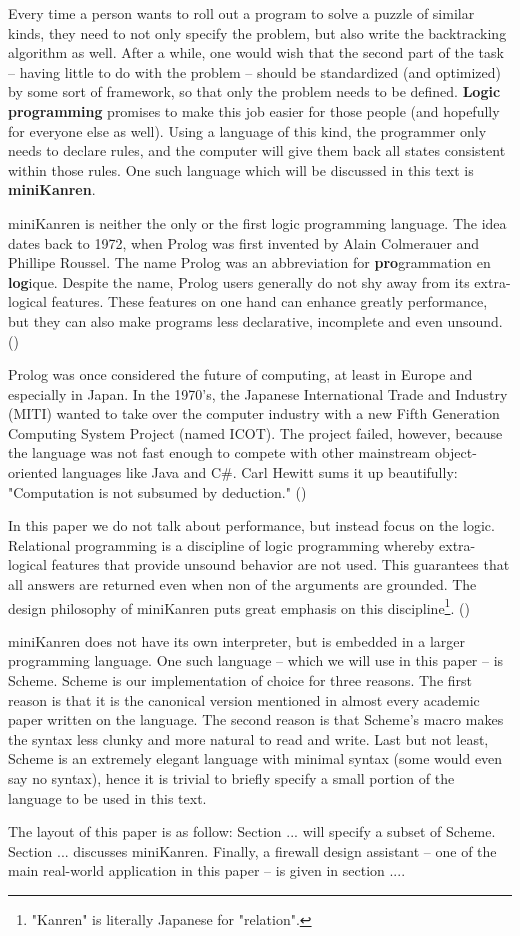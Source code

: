 Every time a person wants to roll out a program to solve a puzzle of similar kinds, they need to not only specify the problem, but also write the backtracking algorithm as well. After a while, one would wish that the second part of the task -- having little to do with the problem -- should be standardized (and optimized) by some sort of framework, so that only the problem needs to be defined. \textbf{Logic programming} promises to make this job easier for those people (and hopefully for everyone else as well). Using a language of this kind, the programmer only needs to declare rules, and the computer will give them back all states consistent within those rules. One such language which will be discussed in this text is \textbf{miniKanren}.

miniKanren is neither the only or the first logic programming language. The idea dates back to 1972, when Prolog was first invented by Alain Colmerauer and Phillipe Roussel. The name Prolog was an abbreviation for \textbf{pro}grammation en \textbf{log}ique. Despite the name, Prolog users generally do not shy away from its extra-logical features. These features on one hand can enhance greatly performance, but they can also make programs less declarative, incomplete and even unsound. (\cite{early-prolog})

Prolog was once considered the future of computing, at least in Europe and especially in Japan. In the 1970's, the Japanese International Trade and Industry (MITI) wanted to take over the computer industry with a new Fifth Generation Computing System Project (named ICOT). The project failed, however, because the language was not fast enough to compete with other mainstream object-oriented languages like Java and C\#. Carl Hewitt sums it up beautifully: "Computation is not subsumed by deduction." (\cite{logic-fail})

In this paper we do not talk about performance, but instead focus on the logic. Relational programming is a discipline of logic programming whereby extra-logical features that provide unsound behavior are not used. This guarantees that all answers are returned even when non of the arguments are grounded. The design philosophy of miniKanren puts great emphasis on this discipline\footnote{"Kanren" is literally Japanese for "relation".}. (\cite{byrdphd})

miniKanren does not have its own interpreter, but is embedded in a larger programming language. One such language -- which we will use in this paper -- is Scheme. Scheme is our implementation of choice for three reasons. The first reason is that it is the canonical version mentioned in almost every academic paper written on the language. The second reason is that Scheme's macro makes the syntax less clunky and more natural to read and write. Last but not least, Scheme is an extremely elegant language with minimal syntax (some would even say no syntax), hence it is trivial to briefly specify a small portion of the language to be used in this text.

The layout of this paper is as follow: Section ... will specify a subset of Scheme. Section ... discusses miniKanren. Finally, a firewall design assistant -- one of the main real-world application in this paper -- is given in section ....